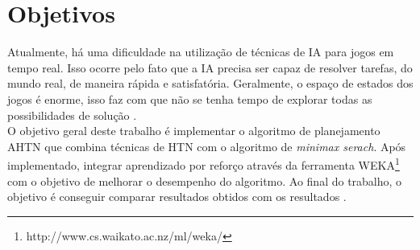 \chapter{\label{chap:obje}Objetivos}

Atualmente, há uma dificuldade na utilização de técnicas de IA para jogos em tempo real. Isso ocorre pelo fato que a IA precisa ser capaz de resolver tarefas, do mundo real, de maneira rápida e satisfatória. Geralmente, o espaço de estados dos jogos é enorme, isso faz com que não se tenha tempo de explorar todas as possibilidades de solução \cite{millington2009artificial}.   \\





O objetivo geral deste trabalho é implementar o algoritmo de planejamento AHTN \cite{ontanon2015adversarial} que combina técnicas de HTN com o algoritmo de \textit{minimax serach}. Após implementado, integrar aprendizado por reforço através da ferramenta WEKA\footnote{http://www.cs.waikato.ac.nz/ml/weka/} com o objetivo de melhorar o desempenho do algoritmo. Ao final do trabalho, o objetivo é conseguir comparar resultados obtidos com os resultados \cite{ontanon2012experiments,hogg2010learning,ontanon2013survey}. 

